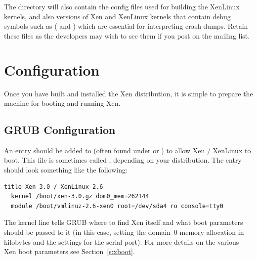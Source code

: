 \documentclass[11pt,twoside,final,openright]{report}
\begin{document}

The  directory will also contain the config
files used for building the XenLinux kernels, and also versions of Xen
and XenLinux kernels that contain debug symbols such as
( and ) which are
essential for interpreting crash dumps. Retain these files as the
developers may wish to see them if you post on the mailing list.


\section{Configuration}
\label{s:configure}

Once you have built and installed the Xen distribution, it is simple to
prepare the machine for booting and running Xen.

\subsection{GRUB Configuration}

An entry should be added to  (often found under
 or ) to allow Xen / XenLinux to boot.
This file is sometimes called , depending on your
distribution. The entry should look something like the following:

{\small
\begin{verbatim}
title Xen 3.0 / XenLinux 2.6
  kernel /boot/xen-3.0.gz dom0_mem=262144
  module /boot/vmlinuz-2.6-xen0 root=/dev/sda4 ro console=tty0
\end{verbatim}
}

The kernel line tells GRUB where to find Xen itself and what boot
parameters should be passed to it (in this case, setting the domain~0
memory allocation in kilobytes and the settings for the serial port).
For more details on the various Xen boot parameters see
Section~\ref{s:xboot}.
\end{document}

